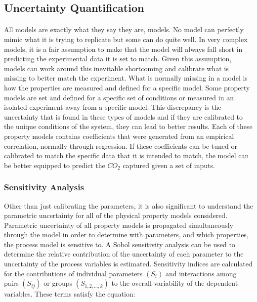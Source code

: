 \documentclass[12pt, letterpaper]{article}
\begin{document}
\subsection{Uncertainty Quantification}

\paragraph{}
All models are exactly what they say they are, models. No model can perfectly mimic what it is trying to replicate but some can do quite well. In very complex models, it is a fair assumption to make that the model will always fall short in predicting the experimental data it is set to match. Given this assumption, models can work around this inevitable shortcoming and calibrate what is missing to better match the experiment. What is normally missing in a model is how the properties are measured and defined for a specific model. Some property models are set and defined for a specific set of conditions or measured in an isolated experiment away from a specific model. This discrepancy is the uncertainty that is found in these types of models and if they are calibrated to the unique conditions of the system, they can lead to better results. Each of these property models contains coefficients that were generated from an empirical correlation, normally through regression. If these coefficients can be tuned or calibrated to match the specific data that it is intended to match, the model can be better equipped to predict the $CO_2$ captured given a set of inputs. 

\subsubsection{Sensitivity Analysis}
Other than just calibrating the parameters, it is also significant to understand the parametric uncertainty for all of the physical property models considered. Parametric uncertainty of all property models is propagated simultaneously through the model in order to determine with parameters, and which properties, the process model is sensitive to. A Sobol sensitivity analysis can be used to determine the relative contribution of the uncertainty of each parameter to the uncertainty of the process variables is estimated. Sensitivity indices are calculated for the contributions of individual parameters $\left(S_i\right)$ and interactions among pairs $\left(S_{i j}\right)$ or groups $\left(S_{1,2, \ldots, k}\right)$ to the overall variability of the dependent variables. These terms satisfy the equation:
\end{document}
